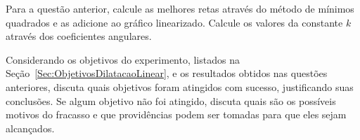 \begin{question}[type={exam}]{1}
Para a questão anterior, calcule as melhores retas através do método de mínimos quadrados e as adicione ao gráfico linearizado. Calcule os valores da constante $k$ através dos coeficientes angulares.
\end{question}

\begin{question}[type={exam}]{1.5}
Considerando os objetivos do experimento, listados na Seção~\ref{Sec:ObjetivosDilatacaoLinear}, e os resultados obtidos nas questões anteriores, discuta quais objetivos foram atingidos com sucesso, justificando suas conclusões. Se algum objetivo não foi atingido, discuta quais são os possíveis motivos do fracasso e que providências podem ser tomadas para que eles sejam alcançados.
\end{question}

\vfill
\pagebreak

